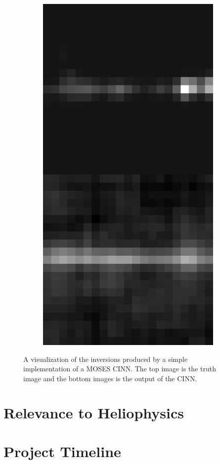\documentclass[10pt, letter]{article}
\begin{document}
\begin{figure}[h!]
\begin{subfigure}[t]{0.18\textwidth}
					\includegraphics[width=\textwidth]{figures/inv5}
				\end{subfigure}	
				\caption{A visualization of the inversions produced by a simple implementation of a MOSES CINN. The top image is the truth image and the bottom images is the output of the CINN.}
			\end{figure}
			
			
		
	\section{Relevance to Heliophysics}
	
	\section{Project Timeline}
	

	\printbibliography

	
\end{document}
